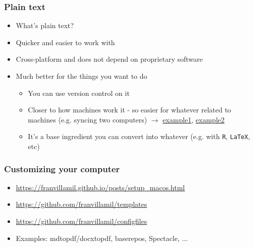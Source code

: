 \documentclass[aspectratio=43]{beamer}
\begin{document}
\begin{frame}
\frametitle{Plain text}
\centering

\begin{itemize}
  \item What's plain text?
  \item Quicker and easier to work with
  \item Cross-platform and does not depend on proprietary software
  \item Much better for the things you want to do
  \begin{itemize}
    \item You can use version control on it
    \item Closer to how machines work it - so easier for whatever related to machines (e.g. syncing two computers) $\rightarrow$ \href{https://github.com/franvillamil/configfiles}{example1}, \href{https://github.com/franvillamil/sublime_settings}{example2}
    \item It's a base ingredient you can convert into whatever (e.g. with \texttt{R}, \texttt{LaTeX}, etc)
  \end{itemize}
\end{itemize}

\end{frame}

\begin{frame}
\frametitle{Customizing your computer}
\centering

\begin{itemize}
  \item \href{https://franvillamil.github.io/posts/setup_macos.html}{https://franvillamil.github.io/posts/setup_macos.html}
  \item \href{https://github.com/franvillamil/templates}{https://github.com/franvillamil/templates}
  \item \href{https://github.com/franvillamil/configfiles}{https://github.com/franvillamil/configfiles}
  \item Examples: mdtopdf/docxtopdf, baserepos, Spectacle, ...
\end{itemize}

\end{frame}
\end{document}
